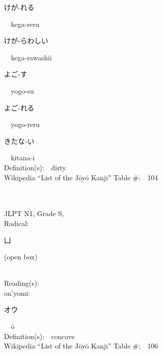 \begin{multicols}{2}
{\hspace*{2em}}{\begin{CJK}{UTF8}{min} けが-れる \end{CJK}}\ \ kega-reru\ \ \\
{\hspace*{2em}}{\begin{CJK}{UTF8}{min} けが-らわしい \end{CJK}}\ \ kega-rawashii\ \ \\
{\hspace*{2em}}{\begin{CJK}{UTF8}{min} よご-す \end{CJK}}\ \ yogo-su\ \ \\
{\hspace*{2em}}{\begin{CJK}{UTF8}{min} よご-れる \end{CJK}}\ \ yogo-reru\ \ \\
{\hspace*{2em}}{\begin{CJK}{UTF8}{min} きたな-い \end{CJK}}\ \ kitana-i\ \ \\
Definition(s):\ \ dirty \\
Wikipedia ``List of the J\=oy\=o Kanji'' Table \#:\ \ 104 \\
\ \ \\
{\fontsize{34pt}{40pt}  }\ \ \\
{JLPT N1, Grade S, \\Radical:\ \ {\begin{CJK}{UTF8}{min} 凵 \end{CJK}} (open box) } \\
Reading(s):\ \ \\
{\hspace*{1em}}on'yomi:\ \ \\
{\hspace*{2em}}{\begin{CJK}{UTF8}{min} オウ \end{CJK}}\ \ \=o\ \ \\
Definition(s):\ \ concave \\
Wikipedia ``List of the J\=oy\=o Kanji'' Table \#:\ \ 106 \\
\ \ \\
{\fontsize{34pt}{40pt}  }\ \ \\  %

\end{multicols}
